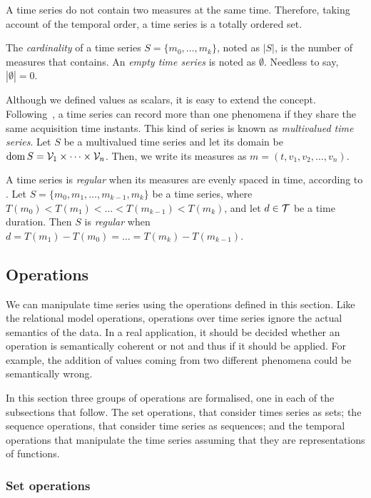 A time series do not contain two measures at the same time. Therefore,
taking account of the temporal order, a time series is a totally
ordered set.

The \emph{cardinality} of a time series $S=\{m_0,\dots,m_k\}$, noted
as $|S|$, is the number of measures that contains.  An \emph{empty
  time series} is noted as $\emptyset$. Needless to say,
$|\emptyset|=0$.

Although we defined values as scalars, it is easy to extend the
concept. Following~\cite{assfalg08:thesis}, a time series can record
more than one phenomena if they share the same acquisition time
instants.  This kind of series is known as \emph{multivalued time
  series}. Let $S$ be a multivalued time series and let its domain be
$\operatorname{dom} S={\cal{V}}_1\times\cdots\times{\cal{V}}_n$. Then, we write its
measures as $m=(t,v_1,v_2,\ldots,v_n)$.

A time series is \emph{regular} when its measures are evenly spaced in
time, according to \cite{last:hetland}.  Let $S=\{m_0, m_1,\ldots,
m_{k-1},m_k\}$ be a time series, where
$T(m_0)<T(m_1)<\dots<T(m_{k-1})<T(m_k)$, and let $d\in\cal{T}$ be a
time duration. Then $S$ is \emph{regular} when $d=T(m_1)-T(m_0)=\dots
=T(m_k)-T(m_{k-1})$.

\subsection{Operations}
\label{sec:model:operations}

We can manipulate time series using the operations defined in this
section. Like the relational model operations, operations over time
series ignore the actual semantics of the data. In a real application,
it should be decided whether an operation is semantically coherent or
not and thus if it should be applied. For example, the addition of
values coming from two different phenomena could be semantically
wrong.

In this section three groups of operations are formalised, one in each
of the subsections that follow. The set operations, that consider
times series as sets; the sequence operations, that consider time
series as sequences; and the temporal operations that manipulate the
time series assuming that they are representations of functions.


\subsubsection{Set operations}
\label{sec:set}

